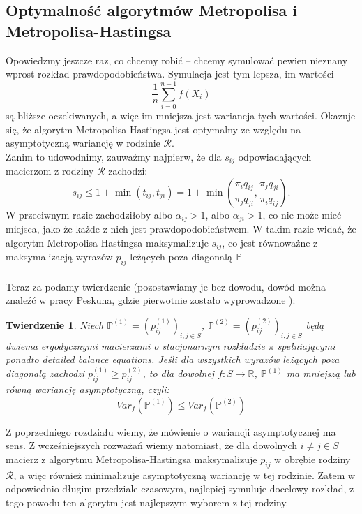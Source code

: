 \documentclass[a4paper]{article}
\theoremstyle{defn}
\theoremstyle{theorem}
\newtheorem{theorem}[defn]{Twierdzenie}
\theoremstyle{lemma}
\theoremstyle{cor}
\theoremstyle{fact}
\begin{document}
\subsection{Optymalność algorytmów Metropolisa i Metropolisa-Hastingsa}
Opowiedzmy jeszcze raz, co chcemy robić – chcemy symulować pewien nieznany wprost rozkład prawdopodobieństwa. Symulacja jest tym lepsza, im wartości $$\frac{1}{n}\sum\limits_{i = 0}^{n-1} f(X_i)$$
są bliższe oczekiwanych, a więc im mniejsza jest wariancja tych wartości. Okazuje się, że algorytm Metropolisa-Hastingsa jest optymalny ze względu na asymptotyczną wariancję w rodzinie $\mathcal{R}$.\\

Zanim to udowodnimy, zauważmy najpierw, że dla $s_{ij}$ odpowiadających macierzom z rodziny $\mathcal{R}$ zachodzi:
$$s_{ij} \leq 1 + \min(t_{ij}, t_{ji}) = 1 + \min\left(\frac{\pi_i q_{ij}}{\pi_j q_{ji}}, \frac{\pi_j q_{ji}}{\pi_i q_{ij}}\right).$$
W przeciwnym razie zachodziłoby albo $\alpha_{ij} > 1$, albo $\alpha_{ji} > 1$, co nie może mieć miejsca, jako że każde z nich jest prawdopodobieństwem. W takim razie widać, że algorytm Metropolisa-Hastingsa maksymalizuje $s_{ij}$, co jest równoważne z maksymalizacją wyrazów $p_{ij}$ leżących poza diagonalą $\mathbb{P}$\\\\
Teraz za \cite{peskun} podamy twierdzenie (pozostawiamy je bez dowodu, dowód można znaleźć w pracy Peskuna, gdzie pierwotnie zostało wyprowadzone \cite{peskun}): \\
\begin{theorem}
Niech $\mathbb{P}^{(1)} = (p_{ij}^{(1)})_{i,j \in S}$, $\mathbb{P}^{(2)}= (p_{ij}^{(2)})_{i,j \in S}$ będą dwiema ergodycznymi macierzami o stacjonarnym rozkładzie $\pi$ spełniającymi ponadto \textit{detailed balance equations}. Jeśli dla wszystkich wyrazów leżących poza diagonalą zachodzi $p_{ij}^{(1)} \geq p_{ij}^{(2)}$, to dla dowolnej $f: S \to \mathbb{R}$,  $\mathbb{P}^{(1)}$ ma mniejszą lub równą wariancję asymptotyczną, czyli:
$$Var_f(\mathbb{P}^{(1)}) \leq Var_f(\mathbb{P}^{(2)})$$
\end{theorem}
Z poprzedniego rozdziału wiemy, że mówienie o wariancji asymptotycznej ma sens. Z wcześniejszych rozważań wiemy natomiast, że dla dowolnych $i \neq j \in S$ macierz z algorytmu Metropolisa-Hastingsa maksymalizuje $p_{ij}$ w obrębie rodziny $\mathcal{R}$, a więc również minimalizuje asymptotyczną wariancję w tej rodzinie. Zatem w odpowiednio długim przedziale czasowym, najlepiej symuluje docelowy rozkład, z tego powodu ten algorytm jest najlepszym wyborem z tej rodziny. \\
\end{document}
